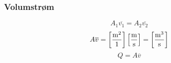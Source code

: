 \documentclass{beamer}
\begin{document}
%
%
%
\begin{frame}
	\frametitle{Volumstrøm}

	


%
$$A_1 \overline{v_1} = A_2 \overline{v_2}$$
%
%
$$A \overline{v} = \left[\hbox{m}^2 \over 1 \right] \left[\hbox{m} \over \hbox{s} \right] = \left[\hbox{m}^3 \over \hbox{s} \right]$$
%
%
$$Q = A \overline{v}$$
%
\end{frame}
%
\end{document}
